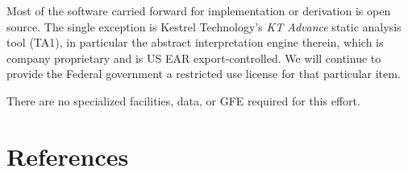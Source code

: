 \documentclass[12pt]{dod-blank}
\begin{document}
Most of the software carried forward for implementation or derivation is open source.  The single exception is Kestrel Technology's {\it KT Advance\/} static analysis tool (TA1), in particular the abstract interpretation engine therein, which is company proprietary and is US EAR export-controlled.   
We will continue to provide the Federal government a restricted use license for that particular item.

There are no specialized facilities, data, or GFE required for this effort. 









\section{References}
 

\end{document}
